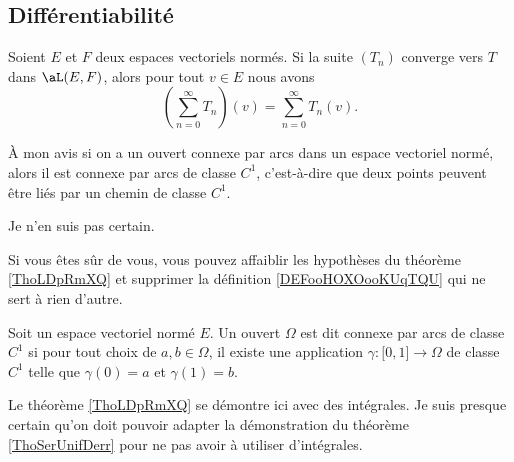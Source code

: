 \subsection{Différentiabilité}

\begin{lemma}
	Soient \( E\) et \( F\) deux espaces vectoriels normés. Si la suite \( (T_n)\) converge vers \( T\) dans \( \aL(E,F)\), alors pour tout \( v\in E\) nous avons
	\begin{equation}
		\left( \sum_{n=0}^{\infty}T_n \right)(v)=\sum_{n=0}^{\infty}T_n(v).
	\end{equation}
\end{lemma}

\begin{probleme}
	À mon avis si on a un ouvert connexe par arcs dans un espace vectoriel normé, alors il est connexe par arcs de classe \( C^1\), c'est-à-dire que deux points peuvent être liés par un chemin de classe \( C^1\).

	Je n'en suis pas certain.

	Si vous êtes sûr de vous, vous pouvez affaiblir les hypothèses du théorème \ref{ThoLDpRmXQ} et supprimer la définition \ref{DEFooHOXOooKUqTQU} qui ne sert à rien d'autre.
\end{probleme}

\begin{definition}      \label{DEFooHOXOooKUqTQU}
	Soit un espace vectoriel normé \( E\). Un ouvert \( \Omega\) est dit connexe par arcs de classe \( C^1\) si pour tout choix de \( a,b\in \Omega\), il existe une application \( \gamma\colon \mathopen[ 0 , 1 \mathclose]\to \Omega\) de classe \( C^1\) telle que \( \gamma(0)=a\) et \( \gamma(1)=b\).
\end{definition}

\begin{probleme}
	Le théorème \ref{ThoLDpRmXQ} se démontre ici avec des intégrales. Je suis presque certain qu'on doit pouvoir adapter la démonstration du théorème \ref{ThoSerUnifDerr} pour ne pas avoir à utiliser d'intégrales.
\end{probleme}

